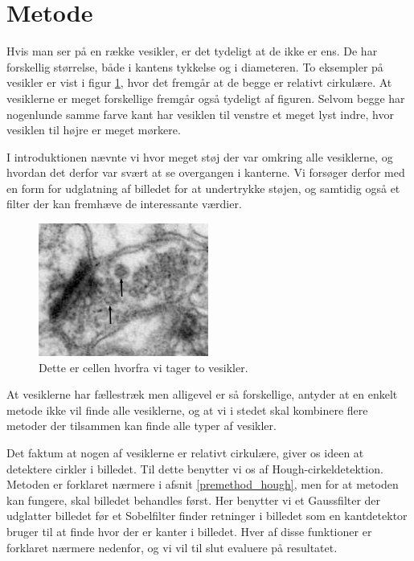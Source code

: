 \thispagestyle{plain}
\section{Metode}
\pagestyle{headings}
Hvis man ser på en række vesikler, er det tydeligt at de ikke er ens. De har forskellig størrelse, både i kantens tykkelse og i diameteren. To eksempler på vesikler er vist i figur \ref{fig:premethod_daddy}, hvor det fremgår at de begge er relativt cirkulære. At vesiklerne er meget forskellige fremgår også tydeligt af figuren. Selvom begge har nogenlunde samme farve kant har vesiklen til venstre et meget lyst indre, hvor vesiklen til højre er meget mørkere. 

I introduktionen nævnte vi hvor meget støj der var omkring alle vesiklerne, og hvordan det derfor var svært at se overgangen i kanterne. Vi forsøger derfor med en form for udglatning af billedet for at undertrykke støjen, og samtidig også et filter der kan fremhæve de interessante værdier.

\begin{figure}[H]
	\centering
	\includegraphics[scale=3.5]{files/premethod/img/ves_color_daddy.png}
	\caption{Dette er cellen hvorfra vi tager to vesikler.\label{fig:premethod_daddy}}
\end{figure}

At vesiklerne har fællestræk men alligevel er så forskellige, antyder at en enkelt metode ikke vil finde alle vesiklerne, og at vi i stedet skal kombinere flere metoder der tilsammen kan finde alle typer af vesikler.

Det faktum at nogen af vesiklerne er relativt cirkulære, giver os ideen at detektere cirkler i billedet. Til dette benytter vi os af Hough-cirkeldetektion. Metoden er forklaret nærmere i afsnit \ref{premethod_hough}, men for at metoden kan fungere, skal billedet behandles først. Her benytter vi et Gaussfilter der udglatter billedet før et Sobelfilter finder retninger i billedet som en kantdetektor bruger til at finde hvor der er kanter i billedet. Hver af disse funktioner er forklaret nærmere nedenfor, og vi vil til slut evaluere på resultatet.


